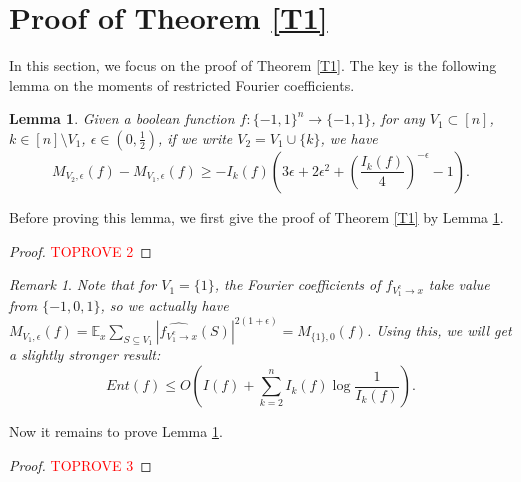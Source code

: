 \documentclass[10pt]{article} \usepackage[utf8]{inputenc}
\newtheorem{lem}{Lemma}[section]
\theoremstyle{definition}
\theoremstyle{remark}
\newtheorem{rem}{Remark}[section]
\numberwithin{equation}{section}
\begin{document}
\section{Proof of Theorem \ref{T1}}
In this section, we focus on the proof of Theorem \ref{T1}. The key is the following lemma on the moments of restricted Fourier coefficients.
\begin{lem}
\label{L31}
Given a boolean function $f:\{-1,1\}^n \to \{-1,1\}$, for any $V_1 \subset [n]$, $k \in [n]\setminus V_1$, $\epsilon \in (0, \frac{1}{2})$, if we write $V_2=V_1 \cup \{k\}$, we have
\begin{equation}
M_{V_2,\epsilon}(f)-M_{V_1,\epsilon}(f) \geq -I_k(f)(3\epsilon +2\epsilon^2+ (\frac{I_k(f)}{4})^{-\epsilon}-1).
\end{equation}
\end{lem}
Before proving this lemma, we first give the proof of Theorem \ref{T1} by Lemma \ref{L31}.
\begin{proof}\textcolor{red}{TOPROVE 2}\end{proof}
\begin{rem}
\emph{Note that for $V_1=\{1\}$, the Fourier coefficients of $f_{V_1^{c} \to x}$ take value from $\{-1, 0, 1\}$, so we actually have $M_{V_1,\epsilon}(f)=\mathbb{E}_x\sum_{S\subseteq V_1}{|\widehat{f_{V_1^{c} \to x}}(S)|^{2(1+\epsilon)}}=M_{\{1\},0}(f)$. Using this, we will get a slightly stronger result: 
$$Ent(f)\leq O(I(f)+\sum_{k=2}^n I_k(f)\log \frac{1}{I_k(f)}).$$}
\end{rem}
Now it remains to prove Lemma \ref{L31}.
\begin{proof}\textcolor{red}{TOPROVE 3}\end{proof}
\end{document}
